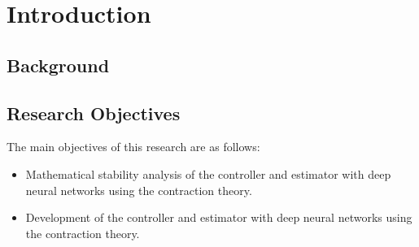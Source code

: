 

\section{Introduction}

\subsection{Background}

\subsection{Research Objectives}

The main objectives of this research are as follows:
\begin{itemize}
    \item Mathematical stability analysis of the controller and estimator with deep neural networks using the contraction theory.
    \item Development of the controller and estimator with deep neural networks using the contraction theory.
\end{itemize}